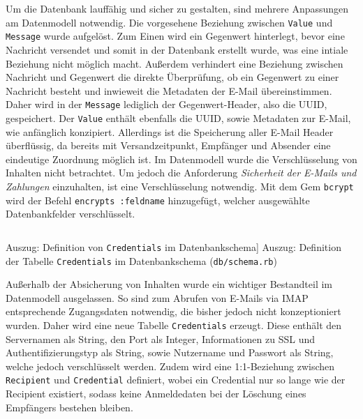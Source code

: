 \noindent Um die Datenbank lauffähig und sicher zu gestalten, sind mehrere Anpassungen am Datenmodell notwendig. Die vorgesehene Beziehung zwischen \texttt{Value} und \texttt{Message} wurde aufgelöst. Zum Einen wird ein Gegenwert hinterlegt, bevor eine Nachricht versendet und somit in der Datenbank erstellt wurde, was eine intiale Beziehung nicht möglich macht. Außerdem verhindert eine Beziehung zwischen Nachricht und Gegenwert die direkte Überprüfung, ob ein Gegenwert zu einer Nachricht besteht und inwieweit die Metadaten der E-Mail übereinstimmen. Daher wird in der \texttt{Message} lediglich der Gegenwert-Header, also die UUID, gespeichert. Der \texttt{Value} enthält ebenfalls die UUID, sowie Metadaten zur E-Mail, wie anfänglich konzipiert. Allerdings ist die Speicherung aller E-Mail Header überflüssig, da bereits mit Versandzeitpunkt, Empfänger und Absender eine eindeutige Zuordnung möglich ist.
Im Datenmodell wurde die Verschlüsselung von Inhalten nicht betrachtet. Um jedoch die Anforderung \textit{Sicherheit der E-Mails und Zahlungen} einzuhalten, ist eine Verschlüsselung notwendig. Mit dem Gem \texttt{bcrypt} wird der Befehl \texttt{encrypts :feldname} hinzugefügt, welcher ausgewählte Datenbankfelder verschlüsselt.

\begin{listing}[!ht]
\inputminted[firstline=16, lastline=27,linenos]{ruby}{Listings/Pkg1/schema.rb}

\caption
    [Auszug: Definition von \texttt{Credentials} im Datenbankschema]
    {Auszug: Definition der Tabelle \texttt{Credentials} im Datenbankschema (\texttt{db/schema.rb})}

\label{lst:credentials}
\end{listing}

\noindent Außerhalb der Absicherung von Inhalten wurde ein wichtiger Bestandteil im Datenmodell ausgelassen. So sind zum Abrufen von E-Mails via IMAP entsprechende Zugangsdaten notwendig, die bisher jedoch nicht konzeptioniert wurden. Daher wird eine neue Tabelle \texttt{Credentials} erzeugt. Diese enthält den Servernamen als String, den Port als Integer, Informationen zu SSL und Authentifizierungstyp als String, sowie Nutzername und Passwort als String, welche jedoch verschlüsselt werden. Zudem wird eine 1:1-Beziehung zwischen \texttt{Recipient} und \texttt{Credential} definiert, wobei ein Credential nur so lange wie der Recipient existiert, sodass keine Anmeldedaten bei der Löschung eines Empfängers bestehen bleiben.


